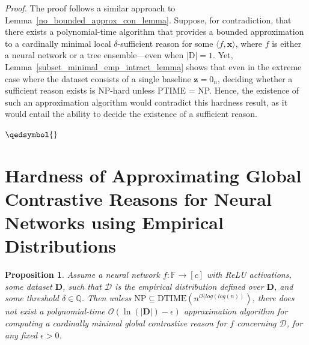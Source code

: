 \documentclass{article}
\newtheorem{proposition}{Proposition}
\newcommand{\z}{\textbf{z}}
\newcommand{\x}{\textbf{x}}
\newcommand{\fml}[1]{{\mathcal{#1}}}
\begin{document}
\emph{Proof.} The proof follows a similar approach to Lemma~\ref{no_bounded_approx_con_lemma}. Suppose, for contradiction, that there exists a polynomial-time algorithm that provides a bounded approximation to a cardinally minimal local $\delta$-sufficient reason for some $\langle f, \x \rangle$, where $f$ is either a neural network or a tree ensemble—even when $|\text{D}| = 1$. Yet, Lemma~\ref{subset_minimal_emp_intract_lemma} shows that even in the extreme case where the dataset consists of a single baseline $\z = 0_n$, deciding whether a sufficient reason exists is NP-hard unless PTIME = NP. Hence, the existence of such an approximation algorithm would contradict this hardness result, as it would entail the ability to decide the existence of a sufficient reason.

$\qedsymbol{}$

%


\section{Hardness of Approximating Global Contrastive Reasons for Neural Networks using Empirical Distributions}
\label{section_hardness_of_approximation}

\begin{proposition}
    Assume a neural network $f:\mathbb{F}\to[c]$ with ReLU activations, some dataset $\mathbf{D}$, such that $\mathcal{D}$ is the empirical distribution defined over $\mathbf{D}$, and some threshold $\delta\in\mathbb{Q}$. Then unless $\text{NP}\subseteq \text{DTIME}(n^{\mathcal{O}(log(log(n))})$, there does not exist a polynomial-time $\mathcal{O}(\ln(|\mathbf{D}|)-\epsilon)$ approximation algorithm for computing a cardinally minimal global contrastive reason for $f$ concerning $\mathcal{D}$, for any fixed $\epsilon>0$. 
\end{proposition}
\end{document}
